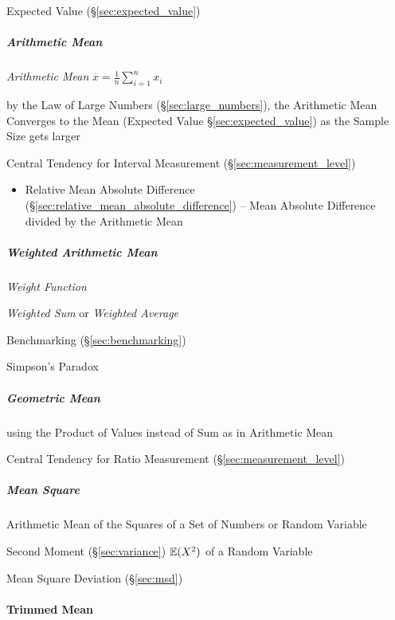 \fist Expected Value (\S\ref{sec:expected_value})



\subparagraph{Arithmetic Mean}\label{sec:arithmetic_mean}\hfill

\emph{Arithmetic Mean} $\overline{x} = \frac{1}{n}\sum_{i=1}^n x_i$

by the Law of Large Numbers (\S\ref{sec:large_numbers}), the Arithmetic Mean
Converges to the Mean (Expected Value \S\ref{sec:expected_value}) as the Sample
Size gets larger

Central Tendency for Interval Measurement (\S\ref{sec:measurement_level})

\begin{itemize}
  \item Relative Mean Absolute Difference
    (\S\ref{sec:relative_mean_absolute_difference}) -- Mean Absolute Difference
    divided by the Arithmetic Mean
\end{itemize}



\subparagraph{Weighted Arithmetic Mean}\label{sec:weighted_mean}\hfill

\emph{Weight Function}

\emph{Weighted Sum} or \emph{Weighted Average}

\fist Benchmarking (\S\ref{sec:benchmarking})

Simpson's Paradox



\subparagraph{Geometric Mean}\label{sec:geometric_mean}\hfill

using the Product of Values instead of Sum as in Arithmetic Mean

Central Tendency for Ratio Measurement (\S\ref{sec:measurement_level})



\subparagraph{Mean Square}\label{sec:mean_square}\hfill

Arithmetic Mean of the Squares of a Set of Numbers or Random Variable

Second Moment (\S\ref{sec:variance}) $\mathbb{E}(X^2)$ of a Random Variable

\fist Mean Square Deviation (\S\ref{sec:msd})



\paragraph{Trimmed Mean}\label{sec:trimmed_mean}\hfill



